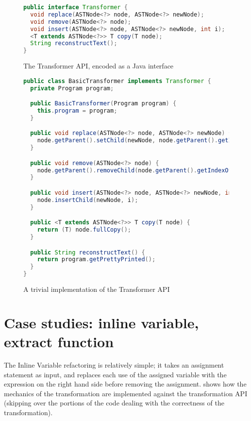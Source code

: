\begin{figure}
\begin{lstlisting}[numbers=none, language=Java]
public interface Transformer {
  void replace(ASTNode<?> node, ASTNode<?> newNode);
  void remove(ASTNode<?> node);
  void insert(ASTNode<?> node, ASTNode<?> newNode, int i);
  <T extends ASTNode<?>> T copy(T node);
  String reconstructText();
}
\end{lstlisting}
\caption{The Transformer API, encoded as a Java interface}
\label{Fig:TransformerAPI}
\end{figure}

\begin{figure}
\begin{lstlisting}[numbers=none, language=Java]
public class BasicTransformer implements Transformer {
  private Program program;

  public BasicTransformer(Program program) {
    this.program = program;
  }

  public void replace(ASTNode<?> node, ASTNode<?> newNode) {
    node.getParent().setChild(newNode, node.getParent().getIndexOfChild(node));
  }

  public void remove(ASTNode<?> node) {
    node.getParent().removeChild(node.getParent().getIndexOfChild(node));
  }

  public void insert(ASTNode<?> node, ASTNode<?> newNode, int i) {
    node.insertChild(newNode, i);
  }

  public <T extends ASTNode<?>> T copy(T node) {
    return (T) node.fullCopy();
  }

  public String reconstructText() {
    return program.getPrettyPrinted();
  }
}
\end{lstlisting}
\caption{A trivial implementation of the Transformer API}
\label{Fig:BasicTransformer}
\end{figure}

\section{Case studies: inline variable, extract function}

The Inline Variable refactoring is relatively simple; it takes an assignment
statement as input, and replaces each use of the assigned variable with the
expression on the right hand side before removing the assignment.
 shows how the mechanics of the transformation are
implemented against the transformation API (skipping over the portions of the
code dealing with the correctness of the transformation).

